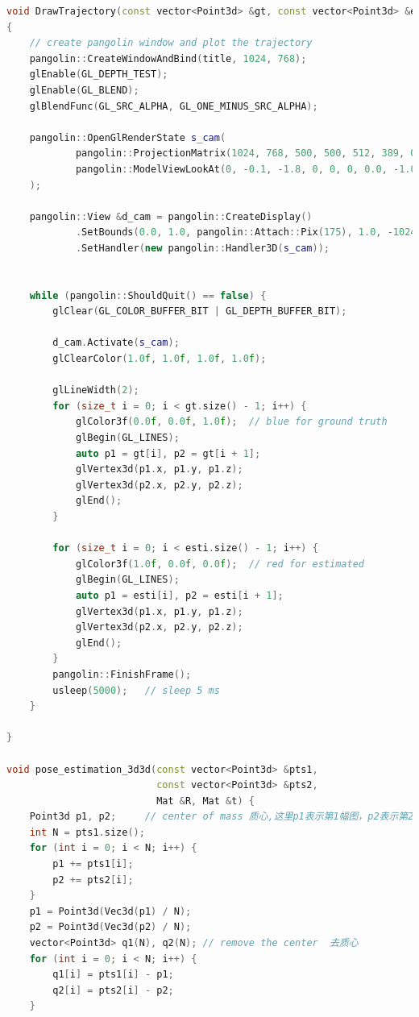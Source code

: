 \documentclass[40pt,a4paper，UTF8]{ctexart}
\numberwithin{equation}{section}
\begin{document}
\begin{lstlisting}[language=C++, caption=main.cpp]
void DrawTrajectory(const vector<Point3d> &gt, const vector<Point3d> &esti, const string& title)
{
    // create pangolin window and plot the trajectory
    pangolin::CreateWindowAndBind(title, 1024, 768);
    glEnable(GL_DEPTH_TEST);
    glEnable(GL_BLEND);
    glBlendFunc(GL_SRC_ALPHA, GL_ONE_MINUS_SRC_ALPHA);

    pangolin::OpenGlRenderState s_cam(
            pangolin::ProjectionMatrix(1024, 768, 500, 500, 512, 389, 0.1, 1000),
            pangolin::ModelViewLookAt(0, -0.1, -1.8, 0, 0, 0, 0.0, -1.0, 0.0)
    );

    pangolin::View &d_cam = pangolin::CreateDisplay()
            .SetBounds(0.0, 1.0, pangolin::Attach::Pix(175), 1.0, -1024.0f / 768.0f)
            .SetHandler(new pangolin::Handler3D(s_cam));


    while (pangolin::ShouldQuit() == false) {
        glClear(GL_COLOR_BUFFER_BIT | GL_DEPTH_BUFFER_BIT);

        d_cam.Activate(s_cam);
        glClearColor(1.0f, 1.0f, 1.0f, 1.0f);

        glLineWidth(2);
        for (size_t i = 0; i < gt.size() - 1; i++) {
            glColor3f(0.0f, 0.0f, 1.0f);  // blue for ground truth
            glBegin(GL_LINES);
            auto p1 = gt[i], p2 = gt[i + 1];
            glVertex3d(p1.x, p1.y, p1.z);
            glVertex3d(p2.x, p2.y, p2.z);
            glEnd();
        }

        for (size_t i = 0; i < esti.size() - 1; i++) {
            glColor3f(1.0f, 0.0f, 0.0f);  // red for estimated
            glBegin(GL_LINES);
            auto p1 = esti[i], p2 = esti[i + 1];
            glVertex3d(p1.x, p1.y, p1.z);
            glVertex3d(p2.x, p2.y, p2.z);
            glEnd();
        }
        pangolin::FinishFrame();
        usleep(5000);   // sleep 5 ms
    }

}

void pose_estimation_3d3d(const vector<Point3d> &pts1,
                          const vector<Point3d> &pts2,
                          Mat &R, Mat &t) {
    Point3d p1, p2;     // center of mass 质心,这里p1表示第1幅图，p2表示第2幅图，和书上的R是反着的，所以要计算R21=这里的R12^(-1)=R12^(T)，最后也输出了
    int N = pts1.size();
    for (int i = 0; i < N; i++) {
        p1 += pts1[i];
        p2 += pts2[i];
    }
    p1 = Point3d(Vec3d(p1) / N);
    p2 = Point3d(Vec3d(p2) / N);
    vector<Point3d> q1(N), q2(N); // remove the center  去质心
    for (int i = 0; i < N; i++) {
        q1[i] = pts1[i] - p1;
        q2[i] = pts2[i] - p2;
    }


\end{lstlisting}
\end{document}
